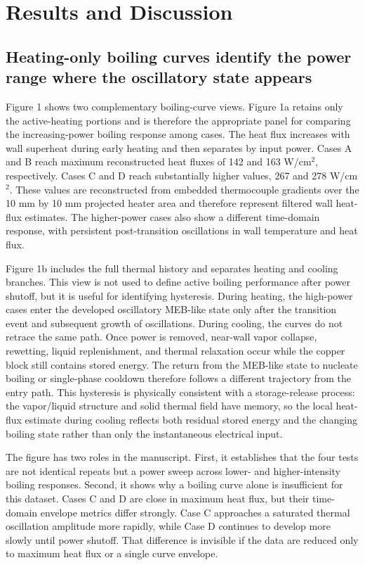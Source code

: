 \documentclass[final,1p,times]{elsarticle}
\begin{document}
\section{Results and Discussion}

\subsection{Heating-only boiling curves identify the power range where the oscillatory state appears}

Figure 1 shows two complementary boiling-curve views. Figure 1a retains only the active-heating portions and is therefore the appropriate panel for comparing the increasing-power boiling response among cases. The heat flux increases with wall superheat during early heating and then separates by input power. Cases A and B reach maximum reconstructed heat fluxes of 142 and 163 W/cm$^2$, respectively. Cases C and D reach substantially higher values, 267 and 278 W/cm$^2$. These values are reconstructed from embedded thermocouple gradients over the 10 mm by 10 mm projected heater area and therefore represent filtered wall heat-flux estimates. The higher-power cases also show a different time-domain response, with persistent post-transition oscillations in wall temperature and heat flux.

Figure 1b includes the full thermal history and separates heating and cooling branches. This view is not used to define active boiling performance after power shutoff, but it is useful for identifying hysteresis. During heating, the high-power cases enter the developed oscillatory MEB-like state only after the transition event and subsequent growth of oscillations. During cooling, the curves do not retrace the same path. Once power is removed, near-wall vapor collapse, rewetting, liquid replenishment, and thermal relaxation occur while the copper block still contains stored energy. The return from the MEB-like state to nucleate boiling or single-phase cooldown therefore follows a different trajectory from the entry path. This hysteresis is physically consistent with a storage-release process: the vapor/liquid structure and solid thermal field have memory, so the local heat-flux estimate during cooling reflects both residual stored energy and the changing boiling state rather than only the instantaneous electrical input.

The figure has two roles in the manuscript. First, it establishes that the four tests are not identical repeats but a power sweep across lower- and higher-intensity boiling responses. Second, it shows why a boiling curve alone is insufficient for this dataset. Cases C and D are close in maximum heat flux, but their time-domain envelope metrics differ strongly. Case C approaches a saturated thermal oscillation amplitude more rapidly, while Case D continues to develop more slowly until power shutoff. That difference is invisible if the data are reduced only to maximum heat flux or a single curve envelope.
\end{document}
